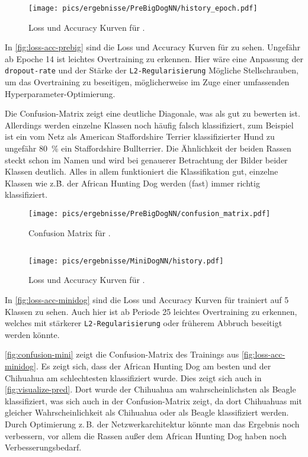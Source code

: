\begin{wrapfigure}{r}{11.2cm}
  \centering
  \texttt{[image: pics/ergebnisse/PreBigDogNN/history\_epoch.pdf]}
  \caption{Loss und Accuracy Kurven für \PreBig{}.}
  \label{fig:loss-acc-prebig}
\end{wrapfigure}

In \autoref{fig:loss-acc-prebig} sind die Loss und Accuracy Kurven für \PreBig{}
zu sehen. Ungefähr ab Epoche 14 ist leichtes Overtraining zu erkennen. Hier
wäre eine Anpassung der \texttt{dropout-rate} und der Stärke der \texttt{L2-Regularisierung}
Mögliche Stellschrauben, um das Overtraining zu beseitigen, möglicherweise im Zuge
einer umfassenden Hyperparameter-Optimierung.

Die Confusion-Matrix zeigt eine deutliche Diagonale, was als gut zu bewerten ist.
Allerdings werden einzelne Klassen noch häufig falsch klassifiziert, zum Beispiel
ist ein vom Netz als American Staffordshire Terrier klassifizierter Hund zu ungefähr
\SI{80}{\percent} ein Staffordshire Bullterrier. Die Ähnlichkeit der beiden Rassen
steckt schon im Namen und wird bei genauerer Betrachtung der Bilder beider Klassen
deutlich. Alles in allem funktioniert die Klassifikation gut, einzelne Klassen
wie z.\.B. der African Hunting Dog werden (fast) immer richtig klassifiziert.

\begin{figure}
  \centering
  \texttt{[image: pics/ergebnisse/PreBigDogNN/confusion\_matrix.pdf]}
  \caption{Confusion Matrix für \PreBig{}.}
  \label{fig:confusion-prebig}
\end{figure}

\subsection{\MiniDog}

\begin{wrapfigure}{r}{11.2cm}
  \centering
  \texttt{[image: pics/ergebnisse/MiniDogNN/history.pdf]}
  \caption{Loss und Accuracy Kurven für \MiniDog{}.}
  \label{fig:loss-acc-minidog}
\end{wrapfigure}

In \autoref{fig:loss-acc-minidog} sind die Loss und Accuracy Kurven für \MiniDog{}
trainiert auf 5 Klassen zu sehen. Auch hier ist ab Periode 25 leichtes
Overtraining zu erkennen, welches mit stärkerer \texttt{L2-Regularisierung} oder
früherem Abbruch beseitigt werden könnte.

\autoref{fig:confusion-mini} zeigt die Confusion-Matrix des Trainings aus
\autoref{fig:loss-acc-minidog}. Es zeigt sich, dass der African Hunting Dog am
besten und der Chihuahua am schlechtesten klassifiziert wurde. Dies zeigt sich
auch in \autoref{fig:visualize-pred}. Dort wurde der Chihuahua am
wahrscheinlichsten als Beagle klassifiziert, was sich auch in der
Confusion-Matrix zeigt, da dort Chihuahuas mit gleicher Wahrscheinlichkeit als
Chihuahua oder als Beagle klassifiziert werden. Durch Optimierung z.\,B. der
Netzwerkarchitektur könnte man das Ergebnis noch verbessern, vor allem die Rassen
außer dem African Hunting Dog haben noch Verbesserungsbedarf.

